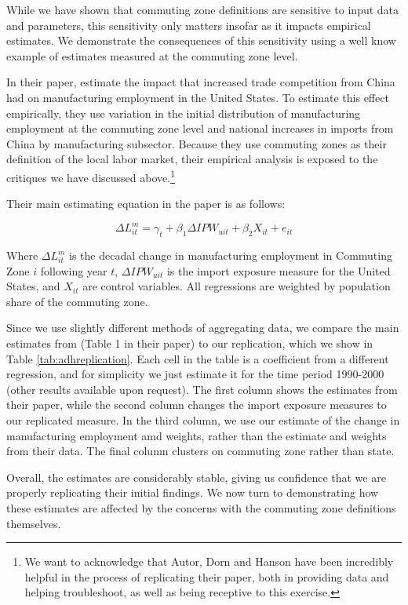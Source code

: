 While we have shown that commuting zone definitions are sensitive to input data and parameters, this sensitivity only matters insofar as it impacts empirical estimates. We demonstrate the consequences of this sensitivity using a well know example of estimates measured at the commuting zone level.

In their paper, \citet{ADH2013} estimate the impact that increased trade competition from China had on manufacturing employment in the United States. To estimate this effect empirically, they use variation in the initial distribution of manufacturing employment at the commuting zone level and national increases in imports from China by manufacturing subsector. Because they use commuting zones as their definition of the local labor market, their empirical analysis is exposed to the critiques we have discussed above.\footnote{We want to acknowledge that Autor, Dorn and Hanson have been incredibly helpful in the process of replicating their paper, both in providing data and helping troubleshoot, as well as being receptive to this exercise.}

Their main estimating equation in the paper is as follows:

\begin{equation}\label{eqn:adh}
\Delta L_{it}^m = \gamma_t + \beta_1 \Delta IPW_{uit} + \beta_2 X_{it} + e_{it}
\end{equation}

Where $\Delta L_{it}^m$ is the decadal change in manufacturing employment in Commuting Zone $i$ following year $t$, $\Delta IPW_{uit}$ is the import exposure measure for the United States, and $X_{it}$ are control variables. All regressions are weighted by population share of the commuting zone.

Since we use slightly different methods of aggregating data, we compare the main estimates from \citet{ADH2013} (Table 1 in their paper) to our replication, which we show in Table \ref{tab:adhreplication}. Each cell in the table is a coefficient from a different regression, and for simplicity we just estimate it for the time period 1990-2000 (other results available upon request). The first column shows the estimates from their paper, while the second column changes the import exposure measures to our replicated measure. In the third column, we use our estimate of the change in manufacturing employment amd weights, rather than the estimate and weights from their data. The final column clusters on commuting zone rather than state.

Overall, the estimates are considerably stable, giving us confidence that we are properly replicating their initial findings. We now turn to demonstrating how these estimates are affected by the concerns with the commuting zone definitions themselves.


